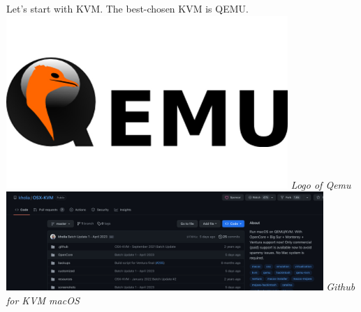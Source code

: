 \documentclass[12pt, letterpaper]{article}
\begin{document}
\hfill\break
\hfill\break
Let's start with KVM. The best-chosen KVM is QEMU.
\hfill\break
\includegraphics[width=0.8\textwidth]{fotos/PSP/Research/Virtualization/Qemu.jpeg}
\break
\emph{Logo of Qemu}
\hfill\break
\hfill\break
\includegraphics[width=0.9\textwidth]{fotos/PSP/Qemu/IMG_0865.jpeg}
\break
\emph{Github for KVM macOS}

\newpage
\end{document}
